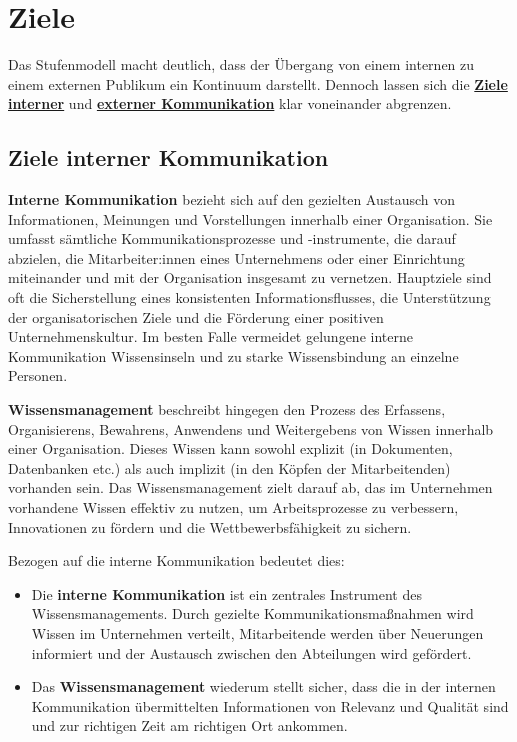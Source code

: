 \documentclass[
  11pt,
  letterpaper,
  DIV=11,
  twoside]{scrreprt}
\begin{document}
\section{Ziele}\label{ziele}

Das Stufenmodell macht deutlich, dass der Übergang von einem internen zu
einem externen Publikum ein Kontinuum darstellt. Dennoch lassen sich die
\textbf{\hyperref[ziele-interner-kommunikation]{Ziele interner}} und
\textbf{\hyperref[ziele-externer-kommunikation]{externer Kommunikation}}
klar voneinander abgrenzen.

\subsection{Ziele interner
Kommunikation}\label{ziele-interner-kommunikation}

\textbf{Interne Kommunikation} bezieht sich auf den gezielten Austausch
von Informationen, Meinungen und Vorstellungen innerhalb einer
Organisation. Sie umfasst sämtliche Kommunikationsprozesse und
-instrumente, die darauf abzielen, die Mitarbeiter:innen eines
Unternehmens oder einer Einrichtung miteinander und mit der Organisation
insgesamt zu vernetzen. Hauptziele sind oft die Sicherstellung eines
konsistenten Informationsflusses, die Unterstützung der
organisatorischen Ziele und die Förderung einer positiven
Unternehmenskultur. Im besten Falle vermeidet gelungene interne
Kommunikation Wissensinseln und zu starke Wissensbindung an einzelne
Personen.

\textbf{Wissensmanagement} beschreibt hingegen den Prozess des
Erfassens, Organisierens, Bewahrens, Anwendens und Weitergebens von
Wissen innerhalb einer Organisation. Dieses Wissen kann sowohl explizit
(in Dokumenten, Datenbanken etc.) als auch implizit (in den Köpfen der
Mitarbeitenden) vorhanden sein. Das Wissensmanagement zielt darauf ab,
das im Unternehmen vorhandene Wissen effektiv zu nutzen, um
Arbeitsprozesse zu verbessern, Innovationen zu fördern und die
Wettbewerbsfähigkeit zu sichern.

Bezogen auf die interne Kommunikation bedeutet dies:

\begin{itemize}
\item
  Die \textbf{interne Kommunikation} ist ein zentrales Instrument des
  Wissensmanagements. Durch gezielte Kommunikationsmaßnahmen wird Wissen
  im Unternehmen verteilt, Mitarbeitende werden über Neuerungen
  informiert und der Austausch zwischen den Abteilungen wird gefördert.
\item
  Das \textbf{Wissensmanagement} wiederum stellt sicher, dass die in der
  internen Kommunikation übermittelten Informationen von Relevanz und
  Qualität sind und zur richtigen Zeit am richtigen Ort ankommen.
\end{itemize}
\end{document}
